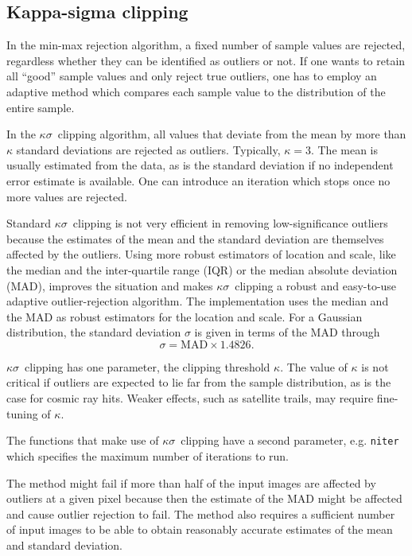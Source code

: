 \subsection{Kappa-sigma clipping}
\label{sec:algorithms:robust:kappa-sigma}

In the min-max rejection algorithm, a fixed number of sample values
are rejected, regardless whether they can be identified as outliers or
not. If one wants to retain all ``good'' sample values and only reject
true outliers, one has to employ an adaptive method which compares
each sample value to the distribution of the entire sample.

In the $\kappa\sigma$~clipping algorithm, all values that deviate from
the mean by more than $\kappa$ standard deviations are rejected as
outliers. Typically, $\kappa=3$. The mean is usually estimated from
the data, as is the standard deviation if no independent error
estimate is available. One can introduce an iteration which stops once
no more values are rejected. 

Standard $\kappa\sigma$~clipping is not very efficient in removing
low-significance outliers because the estimates of the mean and the
standard deviation are themselves affected by the outliers. Using more
robust estimators of location and scale, like the median and the
inter-quartile range (IQR) or the median absolute deviation (MAD),
improves the situation and makes $\kappa\sigma$~clipping a robust and
easy-to-use adaptive outlier-rejection algorithm. The \HDRL
implementation uses the median and the MAD as robust estimators for
the location and scale.  For a Gaussian distribution, the standard
deviation $\sigma$ is given in terms of the MAD through
\begin{equation}
  \label{eq:sigma-MAD}
  \sigma = \mathrm{MAD} \times 1.4826.
\end{equation}

$\kappa\sigma$~clipping has one parameter, the clipping threshold
$\kappa$. The value of $\kappa$ is not critical if outliers are
expected to lie far from the sample distribution, as is the case for
cosmic ray hits. Weaker effects, such as satellite trails, may require
fine-tuning of $\kappa$.

The functions that make use of $\kappa\sigma$~clipping have a second
parameter, e.g.  \lstinline{niter} which specifies the maximum number
of iterations to run.

The method might fail if more than half of the input images are
affected by outliers at a given pixel because then the estimate of the
MAD might be affected and cause outlier rejection to fail. The method
also requires a sufficient number of input images to be able to obtain
reasonably accurate estimates of the mean and standard deviation.

